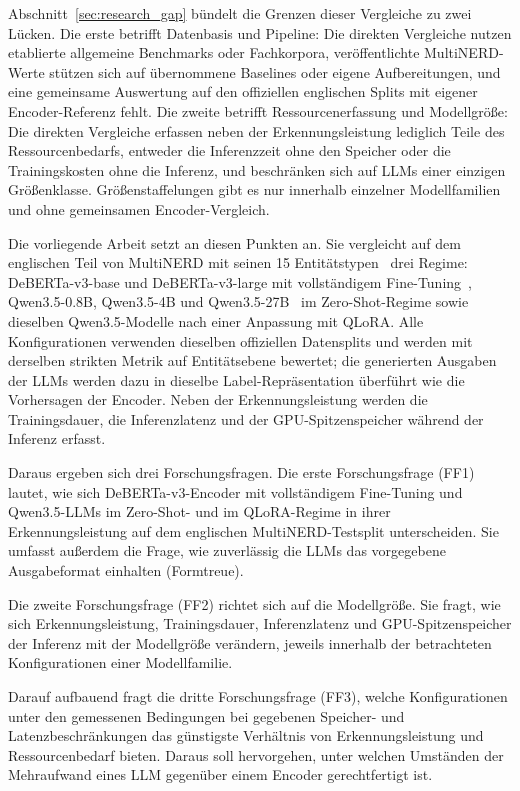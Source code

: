 Abschnitt~\ref{sec:research_gap} bündelt die Grenzen dieser Vergleiche
zu zwei Lücken.
Die erste betrifft Datenbasis und Pipeline: Die direkten Vergleiche
nutzen etablierte allgemeine Benchmarks oder Fachkorpora,
veröffentlichte MultiNERD-Werte stützen sich auf übernommene Baselines
oder eigene Aufbereitungen, und eine gemeinsame Auswertung auf den
offiziellen englischen Splits mit eigener Encoder-Referenz fehlt.
Die zweite betrifft Ressourcenerfassung und Modellgröße: Die direkten
Vergleiche erfassen neben der Erkennungsleistung lediglich Teile des
Ressourcenbedarfs, entweder die Inferenzzeit ohne den Speicher oder die
Trainingskosten ohne die Inferenz, und beschränken sich auf LLMs einer
einzigen Größenklasse. Größenstaffelungen gibt es nur innerhalb einzelner
Modellfamilien und ohne gemeinsamen Encoder-Vergleich.

Die vorliegende Arbeit setzt an diesen Punkten an.
Sie vergleicht auf dem englischen Teil von MultiNERD mit seinen
15 Entitätstypen~\cite{tedeschi2022multinerd} drei Regime:
DeBERTa-v3-base und DeBERTa-v3-large mit vollständigem
Fine-Tuning~\cite{he2021debertav3}, Qwen3.5-0.8B, Qwen3.5-4B und
Qwen3.5-27B~\cite{qwen2026card08b,qwen2026card4b,qwen2026card27b}
im Zero-Shot-Regime sowie dieselben
Qwen3.5-Modelle nach einer Anpassung mit QLoRA.
Alle Konfigurationen verwenden dieselben offiziellen Datensplits und werden
mit derselben strikten Metrik auf Entitätsebene bewertet; die generierten
Ausgaben der LLMs werden dazu in dieselbe Label-Repräsentation überführt
wie die Vorhersagen der Encoder.
Neben der Erkennungsleistung werden die Trainingsdauer, die
Inferenzlatenz und der GPU-Spitzenspeicher während der Inferenz erfasst.

Daraus ergeben sich drei Forschungsfragen.
Die erste Forschungsfrage (FF1) lautet, wie sich
DeBERTa-v3-Encoder mit vollständigem Fine-Tuning und Qwen3.5-LLMs im
Zero-Shot- und im QLoRA-Regime in ihrer Erkennungsleistung auf dem
englischen MultiNERD-Testsplit unterscheiden.
Sie umfasst außerdem die Frage, wie zuverlässig die LLMs das vorgegebene
Ausgabeformat einhalten (Formtreue).

Die zweite Forschungsfrage (FF2) richtet sich auf die Modellgröße.
Sie fragt, wie sich Erkennungsleistung, Trainingsdauer, Inferenzlatenz
und GPU-Spitzenspeicher der Inferenz mit der Modellgröße verändern,
jeweils innerhalb der betrachteten Konfigurationen einer Modellfamilie.

Darauf aufbauend fragt die dritte Forschungsfrage (FF3), welche
Konfigurationen unter den gemessenen Bedingungen bei gegebenen Speicher-
und Latenzbeschränkungen das günstigste Verhältnis von
Erkennungsleistung und Ressourcenbedarf bieten.
Daraus soll hervorgehen, unter welchen Umständen der Mehraufwand eines
LLM gegenüber einem Encoder gerechtfertigt ist.

